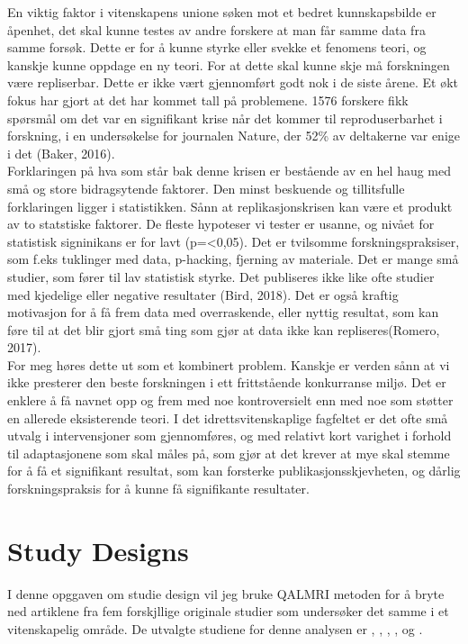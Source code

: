\documentclass[
]{book}
\begin{document}
En viktig faktor i vitenskapens unione søken mot et bedret kunnskapsbilde er åpenhet, det skal kunne testes av andre forskere at man får samme data fra samme forsøk. Dette er for å kunne styrke eller svekke et fenomens teori, og kanskje kunne oppdage en ny teori. For at dette skal kunne skje må forskningen være repliserbar. Dette er ikke vært gjennomført godt nok i de siste årene. Et økt fokus har gjort at det har kommet tall på problemene. 1576 forskere fikk spørsmål om det var en signifikant krise når det kommer til reproduserbarhet i forskning, i en undersøkelse for journalen Nature, der 52\% av deltakerne var enige i det (Baker, 2016).\\
Forklaringen på hva som står bak denne krisen er bestående av en hel haug med små og store bidragsytende faktorer. Den minst beskuende og tillitsfulle forklaringen ligger i statistikken. Sånn at replikasjonskrisen kan være et produkt av to statstiske faktorer. De fleste hypoteser vi tester er usanne, og nivået for statistisk signinikans er for lavt (p=\textless0,05). Det er tvilsomme forskningspraksiser, som f.eks tuklinger med data, p-hacking, fjerning av materiale. Det er mange små studier, som fører til lav statistisk styrke. Det publiseres ikke like ofte studier med kjedelige eller negative resultater (Bird, 2018). Det er også kraftig motivasjon for å få frem data med overraskende, eller nyttig resultat, som kan føre til at det blir gjort små ting som gjør at data ikke kan repliseres(Romero, 2017).\\
For meg høres dette ut som et kombinert problem. Kanskje er verden sånn at vi ikke presterer den beste forskningen i ett frittstående konkurranse miljø. Det er enklere å få navnet opp og frem med noe kontroversielt enn med noe som støtter en allerede eksisterende teori. I det idrettsvitenskaplige fagfeltet er det ofte små utvalg i intervensjoner som gjennomføres, og med relativt kort varighet i forhold til adaptasjonene som skal måles på, som gjør at det krever at mye skal stemme for å få et signifikant resultat, som kan forsterke publikasjonsskjevheten, og dårlig forskningspraksis for å kunne få signifikante resultater.

\hypertarget{study-designs}{%
\chapter{\texorpdfstring{\textbf{Study Designs}}{Study Designs}}\label{study-designs}}

I denne opggaven om studie design vil jeg bruke QALMRI metoden \citep{brosowsky2020} for å bryte ned artiklene fra fem forskjllige originale studier som undersøker det samme i et vitenskapelig område. De utvalgte studiene for denne analysen er \citep{johnsen2021}, \citep{brigatto2019}, \citep{gentil2018}, \citep{saric2019}, og \citep{lasevicius2019}.
\end{document}
